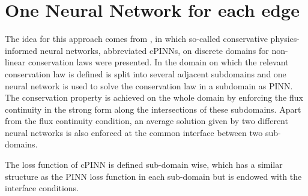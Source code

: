 \section{One Neural Network for each edge}
\label{ch3:sec2}


The idea for this approach comes from \cite{JagtapKharazmiKarniadakis:2020}, in which so-called conservative physics-informed neural networks, abbreviated cPINNs, on discrete domains for non-linear conservation laws were presented. In \cite{JagtapKharazmiKarniadakis:2020} the domain on which the relevant conservation law is defined is split into several adjacent subdomains and one neural network is used to solve the conservation law in a subdomain as PINN. The conservation property is achieved on the whole domain by enforcing the flux continuity in the strong form along the intersections of these subdomains. Apart from the flux continuity condition, an average solution given by two different neural networks is also enforced at the common interface between two sub-domains.


The loss function of cPINN is defined sub-domain wise, which has a similar structure as the PINN loss function in each sub-domain but is endowed with the interface conditions.

